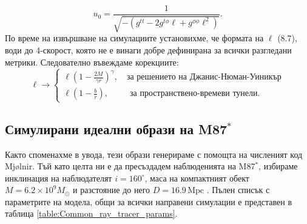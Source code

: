 \begin{equation}
	u_0 = \frac{1}{\sqrt{-(g^{tt} - 2g^{t\phi}\ell + g^{\phi\phi}\ell^2)}}.
\end{equation}
По време на извършване на симулациите установихме, че формата на $\ell$ (8.7), води до 4-скорост, която не е винаги добре дефинирана за всички разгледани метрики. Следователно въвеждаме корекциите:
\begin{equation}
	\ell\rightarrow\begin{cases}
		\ell \left(1 - \frac{2M}{\gamma r}\right)^{\gamma}, \quad\text{за решението на Джанис-Нюман-Уиникър}\\
		\ell \left(1 - \frac{b}{r}\right), \,\,\,\qquad\text{за пространствено-времеви тунели}.
	\end{cases}
\end{equation}
\subsection{Симулирани идеални образи на M87$^*$}
Както споменахме в увода, тези образи генерираме с помощта на численият код Mjølnir. Тъй като целта ни е да пресъздадем наблюденията на M87$^*$, избираме инклинация на наблюдателят $i = 160^\circ$, маса на компактният обект $M = 6.2\times 10^9M_\odot$ и разстояние до него $D = 16.9\, \text{Mpc}$ \cite{EHT_M87_I}. Пълен списък с параметрите на модела, общи за всички направени симулации е представен в таблица \ref{table:Common_ray_tracer_params}.\\

